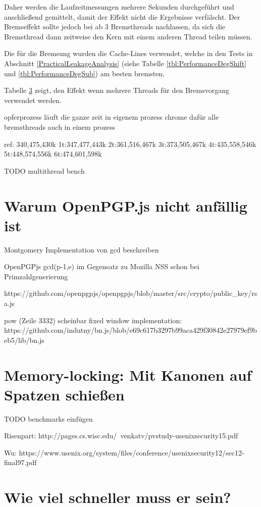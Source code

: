 Daher werden die Laufzeitmessungen mehrere Sekunden durchgeführt und anschließend gemittelt, damit der Effekt nicht die Ergebnisse verfälscht.
Der Bremseffekt sollte jedoch bei ab 3 Bremsthreads nachlassen, da sich die Bremsthread dann zeitweise den Kern mit einem anderen Thread teilen müssen.

Die für die Bremsung wurden die Cache-Lines verwendet, welche in den Tests in Abschnitt \ref{PracticalLeakageAnalysis} (siehe Tabelle \ref{tbl:PerformanceDegShift} und \ref{tbl:PerformanceDegSub}) am besten bremsten.


Tabelle \ref{} zeigt, den Effekt wenn mehrere Threads für den Bremsvorgang verwendet werden.


opferprozess läuft die ganze zeit in eigenem prozess
chrome dafür alle bremsthreads auch in einem prozess

ref: 340,475,430k
1t:347,477,443k
2t:361,516,467k
3t:373,505,467k
4t:435,558,546k
5t:448,574,556k
6t:474,601,598k

TODO multithread bench

\section{Warum OpenPGP.js nicht anfällig ist}

Montgomery Implementation von gcd beschreiben

OpenPGPjs gcd(p-1,e) im Gegensatz zu Mozilla NSS schon bei Primzahlgenerierung

https://github.com/openpgpjs/openpgpjs/blob/master/src/crypto/public_key/rsa.js

pow (Zeile 3332) scheinbar fixed window implementation:\\
https://github.com/indutny/bn.js/blob/e69c617b3297b99aca429f30842e27979ef9beb5/lib/bn.js

\section{Memory-locking: Mit Kanonen auf Spatzen schießen}

TODO benchmarks einfügen

Risenpart:
http://pages.cs.wisc.edu/~venkatv/pvstudy-usenixsecurity15.pdf
\cite{MemoryLockingRisenpart}

Wu:
https://www.usenix.org/system/files/conference/usenixsecurity12/sec12-final97.pdf
\cite{MemoryLockingWu}

\section{Wie viel schneller muss er sein?}

